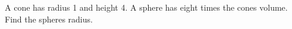 A cone has radius 1 and height 4. A sphere has eight times the cone\textquotesingle s volume. Find the sphere\textquotesingle s radius.
